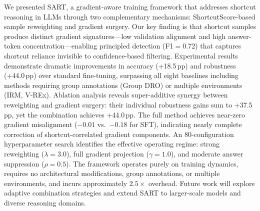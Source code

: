 \documentclass{article}
\begin{document}
We presented SART, a gradient-aware training framework that addresses shortcut reasoning in LLMs through two complementary mechanisms: ShortcutScore-based sample reweighting and gradient surgery. Our key finding is that shortcut samples produce distinct gradient signatures---low validation alignment and high answer-token concentration---enabling principled detection (F1$=$0.72) that captures shortcut reliance invisible to confidence-based filtering. Experimental results demonstrate dramatic improvements in accuracy (+18.5\,pp) and robustness (+44.0\,pp) over standard fine-tuning, surpassing all eight baselines including methods requiring group annotations (Group DRO) or multiple environments (IRM, V-REx). Ablation analysis reveals super-additive synergy between reweighting and gradient surgery: their individual robustness gains sum to +37.5\,pp, yet the combination achieves +44.0\,pp. The full method achieves near-zero gradient misalignment ($-0.01$ vs.\ $-0.18$ for SFT), indicating nearly complete correction of shortcut-correlated gradient components. An 80-configuration hyperparameter search identifies the effective operating regime: strong reweighting ($\lambda=3.0$), full gradient projection ($\gamma=1.0$), and moderate answer suppression ($\rho=0.5$). The framework operates purely on training dynamics, requires no architectural modifications, group annotations, or multiple environments, and incurs approximately $2.5\times$ overhead. Future work will explore adaptive combination strategies and extend SART to larger-scale models and diverse reasoning domains.




\end{document}
